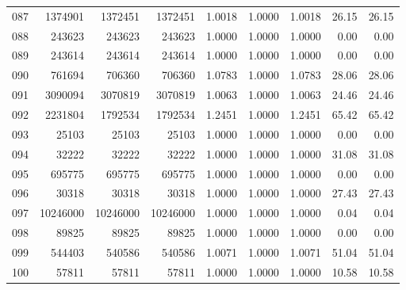 \begin{longtable}{crrrrrrrr}
087 & 1374901 & 1372451 & 1372451 & 1.0018 & 1.0000 & 1.0018 & 26.15 & 26.15 \\
088 & 243623 & 243623 & 243623 & 1.0000 & 1.0000 & 1.0000 & 0.00 & 0.00 \\
089 & 243614 & 243614 & 243614 & 1.0000 & 1.0000 & 1.0000 & 0.00 & 0.00 \\
090 & 761694 & 706360 & 706360 & 1.0783 & 1.0000 & 1.0783 & 28.06 & 28.06 \\
091 & 3090094 & 3070819 & 3070819 & 1.0063 & 1.0000 & 1.0063 & 24.46 & 24.46 \\
092 & 2231804 & 1792534 & 1792534 & 1.2451 & 1.0000 & 1.2451 & 65.42 & 65.42 \\
093 & 25103 & 25103 & 25103 & 1.0000 & 1.0000 & 1.0000 & 0.00 & 0.00 \\
094 & 32222 & 32222 & 32222 & 1.0000 & 1.0000 & 1.0000 & 31.08 & 31.08 \\
095 & 695775 & 695775 & 695775 & 1.0000 & 1.0000 & 1.0000 & 0.00 & 0.00 \\
096 & 30318 & 30318 & 30318 & 1.0000 & 1.0000 & 1.0000 & 27.43 & 27.43 \\
097 & 10246000 & 10246000 & 10246000 & 1.0000 & 1.0000 & 1.0000 & 0.04 & 0.04 \\
098 & 89825 & 89825 & 89825 & 1.0000 & 1.0000 & 1.0000 & 0.00 & 0.00 \\
099 & 544403 & 540586 & 540586 & 1.0071 & 1.0000 & 1.0071 & 51.04 & 51.04 \\
100 & 57811 & 57811 & 57811 & 1.0000 & 1.0000 & 1.0000 & 10.58 & 10.58 \\
\end{longtable}

